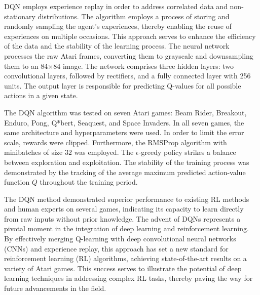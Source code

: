 \documentclass[twocolumn]{webofc}
\begin{document}
DQN employs experience replay in order to address correlated data and non-stationary distributions. The algorithm employs a process of storing and randomly sampling the agent’s experiences, thereby enabling the reuse of experiences on multiple occasions. This approach serves to enhance the efficiency of the data and the stability of the learning process. The neural network processes the raw Atari frames, converting them to grayscale and downsampling them to an 84×84 image. The network comprises three hidden layers: two convolutional layers, followed by rectifiers, and a fully connected layer with 256 units. The output layer is responsible for predicting Q-values for all possible actions in a given state. \cite{mnih2013playingatarideepreinforcement}

The DQN algorithm was tested on seven Atari games: Beam Rider, Breakout, Enduro, Pong, Q*bert, Seaquest, and Space Invaders. In all seven games, the same architecture and hyperparameters were used. In order to limit the error scale, rewards were clipped. Furthermore, the RMSProp algorithm with minibatches of size $32$ was employed. The $\epsilon$-greedy policy strikes a balance between exploration and exploitation. The stability of the training process was demonstrated by the tracking of the average maximum predicted action-value function $Q$ throughout the training period. \cite{mnih2013playingatarideepreinforcement}

The DQN method demonstrated superior performance to existing RL methods and human experts on several games, indicating its capacity to learn directly from raw inputs without prior knowledge. The advent of DQNs represents a pivotal moment in the integration of deep learning and reinforcement learning. By effectively merging Q-learning with deep convolutional neural networks (CNNs) and experience replay, this approach has set a new standard for reinforcement learning (RL) algorithms, achieving state-of-the-art results on a variety of Atari games. This success serves to illustrate the potential of deep learning techniques in addressing complex RL tasks, thereby paving the way for future advancements in the field. \cite{mnih2013playingatarideepreinforcement}




\end{document}

